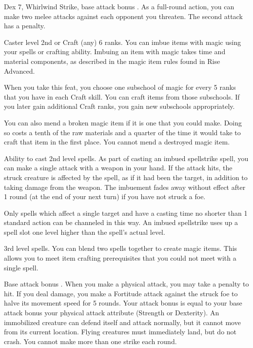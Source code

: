 \featpres Dex 7, Whirlwind Strike, base attack bonus .
\featben As a full-round action, you can make two melee attacks against each opponent you threaten. The second attack has a  penalty.

 Caster level 2nd or Craft (any) 6 ranks.
 You can imbue items with magic using your spells or crafting ability. Imbuing an item with magic takes time and material components, as described in the magic item rules found in Rise Advanced.

When you take this feat, you choose one subschool of magic for every 5 ranks that you have in each Craft skill. You can craft items from those subschools. If you later gain additional Craft ranks, you gain new subschools appropriately.

You can also mend a broken magic item if it is one that you could make. Doing so costs a tenth of the raw materials and a quarter of the time it would take to craft that item in the first place. You cannot mend a destroyed magic item.

 Ability to cast 2nd level spells.
 As part of casting an imbued spellstrike spell, you can make a single attack with a weapon in your hand. If the attack hits, the struck creature is affected by the spell, as if it had been the target, in addition to taking damage from the weapon. The imbuement fades away without effect after 1 round (at the end of your next turn) if you have not struck a foe.

Only spells which affect a single target and have a casting time no shorter than 1 standard action can be channeled in this way. An imbued spellstrike uses up a spell slot one level higher than the spell's actual level.

 3rd level spells.
 You can blend two spells together to create magic items. This allows you to meet item crafting prerequisites that you could not meet with a single spell.

\featpre Base attack bonus .
\featben When you make a physical attack, you may take a  penalty to hit. If you deal damage, you make a Fortitude attack against the struck foe to halve its movement speed for 5 rounds. Your attack bonus is equal to your base attack bonus \add your physical attack attribute (Strength or Dexterity). An immobilized creature can defend itself and attack normally, but it cannot move from its current location. Flying creatures must immediately land, but do not crash. You cannot make more than one strike each round.

